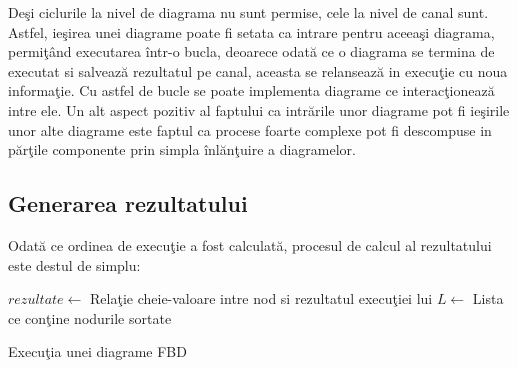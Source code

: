 Deşi ciclurile la nivel de diagrama nu sunt permise, cele la nivel de canal sunt. Astfel, ieşirea unei diagrame poate fi setata ca intrare pentru aceeaşi diagrama, permiţând executarea într-o bucla, deoarece odată ce o diagrama se termina de executat si salvează rezultatul pe canal, aceasta se relansează in execuţie cu noua informaţie. Cu astfel de bucle se poate implementa diagrame ce interacţionează intre ele. Un alt aspect pozitiv al faptului ca intrările unor diagrame pot fi ieşirile unor alte diagrame este faptul ca procese foarte complexe pot fi descompuse in părţile componente prin simpla înlănţuire a diagramelor.

\subsection{Generarea rezultatului}
Odată ce ordinea de execuţie a fost calculată, procesul de calcul al rezultatului este destul de simplu:

\begin{algorithm}[H]
	$rezultate \gets$ Relaţie cheie-valoare intre nod si rezultatul execuţiei lui\;
	$L \gets$ Lista ce conţine nodurile sortate \;

{}
\label{alg:executeDiagram}
\caption{Execuţia unei diagrame FBD}
\end{algorithm}

